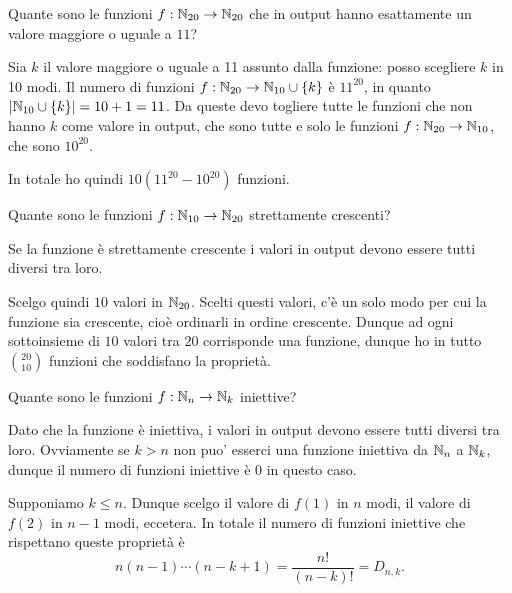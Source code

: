 \begin{example}
    Quante sono le funzioni $f : \mathbb{N}_{20} \to \mathbb{N}_{20}$ che in output hanno esattamente un valore maggiore o uguale a $11$?
\end{example}
\begin{solution}
    Sia $k$ il valore maggiore o uguale a 11 assunto dalla funzione: posso scegliere $k$ in 10 modi. Il numero di funzioni $f : \mathbb{N}_{20} \to \mathbb{N}_{10} \cup \{k\}$ è $11^{20}$, in quanto $\left|\mathbb{N}_{10} \cup \{k\}\right| = 10 + 1 = 11$. Da queste devo togliere tutte le funzioni che non hanno $k$ come valore in output, che sono tutte e solo le funzioni $f : \mathbb{N}_{20} \to \mathbb{N}_{10}$, che sono $10^{20}$.

    In totale ho quindi $10(11^{20} - 10^{20})$ funzioni.
\end{solution}

\begin{example}
    Quante sono le funzioni $f : \mathbb{N}_{10} \to \mathbb{N}_{20}$ strettamente crescenti?
\end{example}
\begin{solution}
    Se la funzione è strettamente crescente i valori in output devono essere tutti diversi tra loro.

    Scelgo quindi $10$ valori in $\mathbb{N}_{20}$. Scelti questi valori, c'è un solo modo per cui la funzione sia crescente, cioè ordinarli in ordine crescente. Dunque ad ogni sottoinsieme di $10$ valori tra $20$ corrisponde una funzione, dunque ho in tutto $\binom{20}{10}$ funzioni che soddisfano la proprietà.
\end{solution}

\begin{example}
    Quante sono le funzioni $f : \mathbb{N}_n \to \mathbb{N}_k$ iniettive?
\end{example}
\begin{solution}
    Dato che la funzione è iniettiva, i valori in output devono essere tutti diversi tra loro. Ovviamente se $k > n$ non puo' esserci una funzione iniettiva da $\mathbb{N}_n$ a $\mathbb{N}_k$, dunque il numero di funzioni iniettive è 0 in questo caso.

    Supponiamo $k \leq n$. Dunque scelgo il valore di $f(1)$ in $n$ modi, il valore di $f(2)$ in $n-1$ modi, eccetera. In totale il numero di funzioni iniettive che rispettano queste proprietà è \[
        n(n-1) \cdots (n-k+1) = \frac{n!}{(n-k)!} = D_{n, k}.    
    \]
\end{solution}


